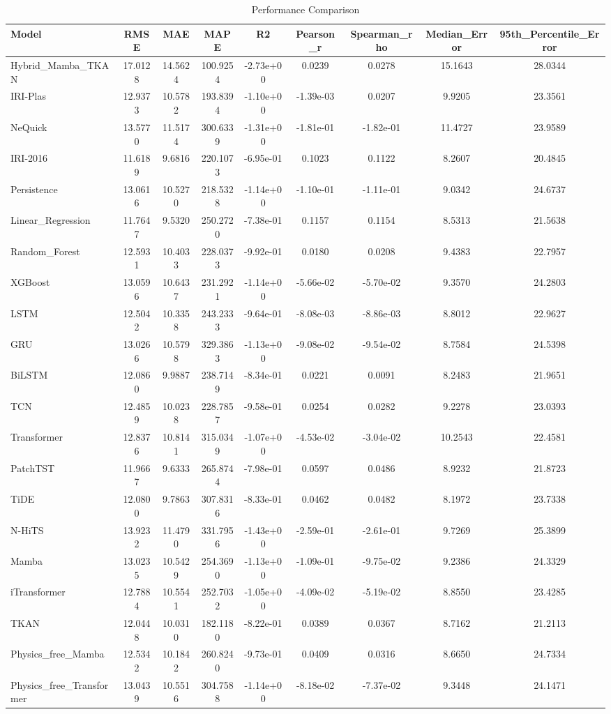 \begin{table}[htbp]
\centering
\caption{Performance Comparison}
\begin{tabular}{|l|c|c|c|c|c|c|c|c|}
\hline
\textbf{Model} & \textbf{RMSE} & \textbf{MAE} & \textbf{MAPE} & \textbf{R2} & \textbf{Pearson_r} & \textbf{Spearman_rho} & \textbf{Median_Error} & \textbf{95th_Percentile_Error} \\
\hline
Hybrid\_Mamba\_TKAN & 17.0128 & 14.5624 & 100.9254 & -2.73e+00 & 0.0239 & 0.0278 & 15.1643 & 28.0344 \\
IRI-Plas & 12.9373 & 10.5782 & 193.8394 & -1.10e+00 & -1.39e-03 & 0.0207 & 9.9205 & 23.3561 \\
NeQuick & 13.5770 & 11.5174 & 300.6339 & -1.31e+00 & -1.81e-01 & -1.82e-01 & 11.4727 & 23.9589 \\
IRI-2016 & 11.6189 & 9.6816 & 220.1073 & -6.95e-01 & 0.1023 & 0.1122 & 8.2607 & 20.4845 \\
Persistence & 13.0616 & 10.5270 & 218.5328 & -1.14e+00 & -1.10e-01 & -1.11e-01 & 9.0342 & 24.6737 \\
Linear\_Regression & 11.7647 & 9.5320 & 250.2720 & -7.38e-01 & 0.1157 & 0.1154 & 8.5313 & 21.5638 \\
Random\_Forest & 12.5931 & 10.4033 & 228.0373 & -9.92e-01 & 0.0180 & 0.0208 & 9.4383 & 22.7957 \\
XGBoost & 13.0596 & 10.6437 & 231.2921 & -1.14e+00 & -5.66e-02 & -5.70e-02 & 9.3570 & 24.2803 \\
LSTM & 12.5042 & 10.3358 & 243.2333 & -9.64e-01 & -8.08e-03 & -8.86e-03 & 8.8012 & 22.9627 \\
GRU & 13.0266 & 10.5798 & 329.3863 & -1.13e+00 & -9.08e-02 & -9.54e-02 & 8.7584 & 24.5398 \\
BiLSTM & 12.0860 & 9.9887 & 238.7149 & -8.34e-01 & 0.0221 & 0.0091 & 8.2483 & 21.9651 \\
TCN & 12.4859 & 10.0238 & 228.7857 & -9.58e-01 & 0.0254 & 0.0282 & 9.2278 & 23.0393 \\
Transformer & 12.8376 & 10.8141 & 315.0349 & -1.07e+00 & -4.53e-02 & -3.04e-02 & 10.2543 & 22.4581 \\
PatchTST & 11.9667 & 9.6333 & 265.8744 & -7.98e-01 & 0.0597 & 0.0486 & 8.9232 & 21.8723 \\
TiDE & 12.0800 & 9.7863 & 307.8316 & -8.33e-01 & 0.0462 & 0.0482 & 8.1972 & 23.7338 \\
N-HiTS & 13.9232 & 11.4790 & 331.7956 & -1.43e+00 & -2.59e-01 & -2.61e-01 & 9.7269 & 25.3899 \\
Mamba & 13.0235 & 10.5429 & 254.3690 & -1.13e+00 & -1.09e-01 & -9.75e-02 & 9.2386 & 24.3329 \\
iTransformer & 12.7884 & 10.5541 & 252.7032 & -1.05e+00 & -4.09e-02 & -5.19e-02 & 8.8550 & 23.4285 \\
TKAN & 12.0448 & 10.0310 & 182.1180 & -8.22e-01 & 0.0389 & 0.0367 & 8.7162 & 21.2113 \\
Physics\_free\_Mamba & 12.5342 & 10.1842 & 260.8240 & -9.73e-01 & 0.0409 & 0.0316 & 8.6650 & 24.7334 \\
Physics\_free\_Transformer & 13.0439 & 10.5516 & 304.7588 & -1.14e+00 & -8.18e-02 & -7.37e-02 & 9.3448 & 24.1471 \\
\hline
\end{tabular}
\end{table}
